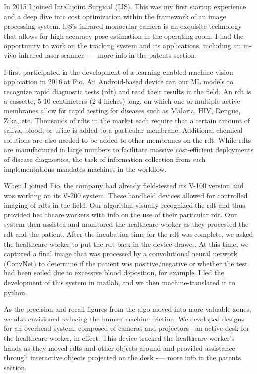 \osspacing
In 2015 I joined Intellijoint Surgical (IJS). This was my first startup experience and a deep dive into cost optimization within the framework of an image processing system. IJS’s infrared monocular camera is an exquisite technology that allows for high-accuracy pose estimation in the operating room. I had the opportunity to work on the tracking system and its applications, including an in-vivo infrared laser scanner -— more info in the patents section.

\osspacing
I first participated in the development of a learning-enabled machine vision application in 2016 at Fio. An Android-based device ran our ML models to recognize rapid diagnostic tests (rdt) and read their results in the field. An rdt is a cassette, 5-10 centimeters (2-4 inches) long, on which one or multiple active membranes allow for rapid testing for diseases such as Malaria, HIV, Dengue, Zika, etc. Thousands of rdts in the market each require that a certain amount of saliva, blood, or urine is added to a particular membrane. Additional chemical solutions are also needed to be added to other membranes on the rdt. While rdts are manufactured in large numbers to facilitate massive cost-efficient deployments of disease diagnostics, the task of information-collection from such implementations mandates machines in the workflow.

\osspacing
When I joined Fio, the company had already field-tested its V-100 version and was working on its V-200 system. These handheld devices allowed for controlled imaging of rdts in the field. Our algorithm visually recognized the rdt and thus provided healthcare workers with info on the use of their particular rdt. Our system then assisted and monitored the healthcare worker as they processed the rdt and the patient. After the incubation time for the rdt was complete, we asked the healthcare worker to put the rdt back in the device drawer. At this time, we captured a final image that was processed by a convolutional neural network (ConvNet) to determine if the patient was positive/negative or whether the test had been soiled due to excessive blood deposition, for example. I led the development of this system in matlab, and we then machine-translated it to python.
 
\osspacing
As the precision and recall figures from the algo moved into more valuable zones, we also envisioned reducing the human-machine friction. We developed designs for an overhead system, composed of cameras and projectors - an active desk for the healthcare worker, in effect. This device tracked the healthcare worker’s hands as they moved rdts and other objects around and provided assistance through interactive objects projected on the desk -— more info in the patents section.

